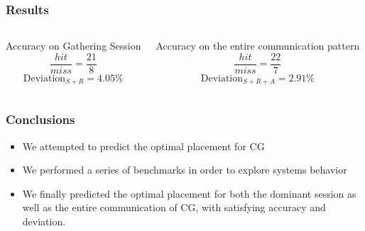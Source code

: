 \documentclass{beamer}
\begin{document}
\begin{frame}
\frametitle{Results}

\begin{columns}[c]

\begin{block}{Accuracy on Gathering Session}
$$\frac{hit}{miss}=\frac{21}{8}$$
$$ \text{Deviation}_{S+R}=4.05\%$$
\end{block}
\begin{block}{Accuracy on the entire communication pattern}
$$\frac{hit}{miss}=\frac{22}{7}$$
$$ \text{Deviation}_{S+R+A}=2.91\%$$
\end{block}
\end{columns}

\end{frame}
\begin{frame}
\frametitle{Conclusions}

\begin{itemize}
\item {\fontsize{8}{6}\selectfont We attempted to predict the optimal placement for CG }
\item {\fontsize{8}{6}\selectfont We performed a series of benchmarks in order to explore systems behavior}
\item {\fontsize{8}{6}\selectfont We finally predicted the optimal placement for both the dominant session as well as the entire communication of CG, with satisfying accuracy and deviation.}
\end{itemize}

\end{frame}
\end{document}
